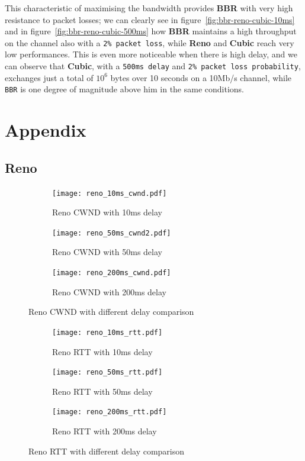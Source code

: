 \documentclass{exam}
\begin{document}
This characteristic of maximising the bandwidth provides \textbf{BBR} with very high resistance to packet losses; we can clearly see in  figure~\ref{fig:bbr-reno-cubic-10ms} and in figure~\ref{fig:bbr-reno-cubic-500ms} how \textbf{BBR} maintains a high throughput on the channel also with a \texttt{2\% packet loss}, while \textbf{Reno} and \textbf{Cubic} reach very low performances. This is even more noticeable when there is high delay, and we can observe that \textbf{Cubic}, with a \texttt{500ms delay} and \texttt{2\% packet loss probability}, exchanges just a total of $10^6$ bytes over 10 seconds on a 10Mb/s channel, while \texttt{BBR} is one degree of magnitude above him in the same conditions.  

\newpage

\section{Appendix}

\subsection{Reno}

\begin{figure}[H]
    \centering
    \begin{subfigure}{0.40\textwidth}
        \centering
        \texttt{[image: reno\_10ms\_cwnd.pdf]}  
        \caption{Reno CWND with 10ms delay}
    \end{subfigure}
    \hfill
    \begin{subfigure}{0.40\textwidth}
        \centering
        \texttt{[image: reno\_50ms\_cwnd2.pdf]}
        \caption{Reno CWND with 50ms delay}
    \end{subfigure}
    \hfill
    \begin{subfigure}{0.40\textwidth}
        \centering
        \texttt{[image: reno\_200ms\_cwnd.pdf]}
        \caption{Reno CWND with 200ms delay}
    \end{subfigure}
    \caption{Reno CWND with different delay comparison}
    \label{fig:reno_cwnd_comparison}
\end{figure}

\begin{figure}[H]
    \centering
    \begin{subfigure}{0.40\textwidth}
        \centering
        \texttt{[image: reno\_10ms\_rtt.pdf]}  
        \caption{Reno RTT with 10ms delay}
    \end{subfigure}
    \hfill
    \begin{subfigure}{0.40\textwidth}
        \centering
        \texttt{[image: reno\_50ms\_rtt.pdf]}
        \caption{Reno RTT with 50ms delay}
    \end{subfigure}
    \hfill
    \begin{subfigure}{0.40\textwidth}
        \centering
        \texttt{[image: reno\_200ms\_rtt.pdf]}
        \caption{Reno RTT with 200ms delay}
    \end{subfigure}
    \caption{Reno RTT with different delay comparison}
    \label{fig:reno_rtt_comparison}
\end{figure}
\end{document}
